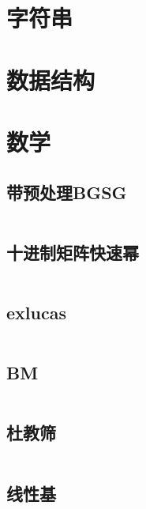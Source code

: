 \documentclass[a4paper,11pt]{article}
\begin{document}






\newpage
\section{字符串}








\newpage
\section{数据结构}











\newpage
\section{数学} %

\subsection{带预处理BGSG}
\inputminted[breaklines]{c++}{Math/BGSG.cpp}

\subsection{十进制矩阵快速幂}
\inputminted[breaklines]{c++}{Math/kuaisumi.cpp}

\subsection{exlucas}
\inputminted[breaklines]{c++}{Math/exlucas.cpp}

\subsection{BM}
\inputminted[breaklines]{c++}{Math/BM.cpp}

\subsection{杜教筛}
\inputminted[breaklines]{c++}{Math/dujiaoshai.cpp}

\subsection{线性基}
\inputminted[breaklines]{c++}{Math/xianxingji.cpp}
\end{document}
